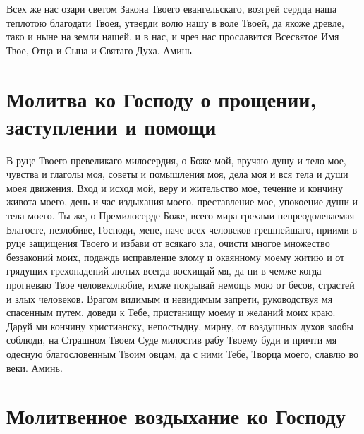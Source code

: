 \begin{mymulticols}
Всех же нас озари светом Закона Твоего евангельскаго, возгрей сердца наша теплотою благодати Твоея, утверди волю нашу в воле Твоей, да якоже древле, тако и ныне на земли нашей, и в нас, и чрез нас прославится Всесвятое Имя Твое, Отца и Сына и Святаго Духа. Аминь. 

\end{mymulticols}

\section{Молитва ко Господу о прощении, заступлении и помощи}\begin{mymulticols}
 

В руце Твоего превеликаго милосердия, о Боже мой, вручаю душу и тело мое, чувства и глаголы моя, советы и помышления моя, дела моя и вся тела и души моея движения. Вход и исход мой, веру и жительство мое, течение и кончину живота моего, день и час издыхания моего, преставление мое, упокоение души и тела моего. Ты же, о Премилосерде Боже, всего мира грехами непреодолеваемая Благосте, незлобиве, Господи, мене, паче всех человеков грешнейшаго, приими в руце защищения Твоего и избави от всякаго зла, очисти многое множество беззаконий моих, подаждь исправление злому и окаянному моему житию и от грядущих грехопадений лютых всегда восхищай мя, да ни в чемже когда прогневаю Твое человеколюбие, имже покрывай немощь мою от бесов, страстей и злых человеков. Врагом видимым и невидимым запрети, руководствуя мя спасенным путем, доведи к Тебе, пристанищу моему и желаний моих краю. Даруй ми кончину христианску, непостыдну, мирну, от воздушных духов злобы соблюди, на Страшном Твоем Суде милостив рабу Твоему буди и причти мя одесную благословенным Твоим овцам, да с ними Тебе, Творца моего, славлю во веки. Аминь.

\end{mymulticols}

\section{Молитвенное воздыхание ко Господу}

{\centering{}\par}

